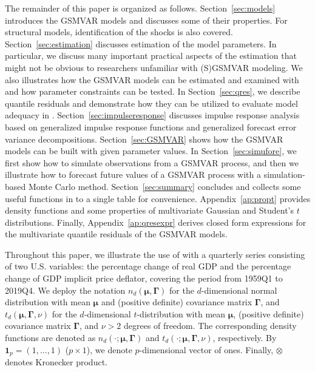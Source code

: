 \documentclass[nojss]{jss} %
\begin{document}
The remainder of this paper is organized as follows. Section~\ref{sec:models} introduces the GSMVAR models and discusses some of their properties. For structural models, identification of the shocks is also covered. Section~\ref{sec:estimation} discusses estimation of the model parameters. In particular, we discuss many important practical aspects of the estimation that might not be obvious to researchers unfamiliar with (S)GSMVAR modeling. We also illustrates how the GSMVAR models can be estimated and examined with  and how parameter constraints can be tested.  In Section~\ref{sec:qres}, we describe quantile residuals and demonstrate how they can be utilized to evaluate model adequacy in . Section~\ref{sec:impulseresponse} discusses impulse response analysis based on generalized impulse response functions and generalized forecast error variance decompositions. Section~\ref{sec:GSMVAR} shows how the GSMVAR models can be built with given parameter values. In Section~\ref{sec:simufore}, we first show how to simulate observations from a GSMVAR process, and then we illustrate how to forecast future values of a GSMVAR process with a simulation-based Monte Carlo method. Section~\ref{sec:summary} concludes and collects some useful functions in  to a single table for convenience. Appendix~\ref{ap:propt} provides density functions and some properties of multivariate Gaussian and Student's $t$ distributions. Finally, Appendix~\ref{ap:qresexpr} derives closed form expressions for the multivariate quantile residuals of the GSMVAR models.

Throughout this paper, we illustrate the use of  with a quarterly series consisting of two U.S. variables: the percentage change of real GDP and the percentage change of GDP implicit price deflator, covering the period from 1959Q1 to 2019Q4. We deploy the notation $n_d(\boldsymbol{\mu},\boldsymbol{\Gamma})$ for the $d$-dimensional normal distribution with mean $\boldsymbol{\mu}$ and (positive definite) covariance matrix $\boldsymbol{\Gamma}$, and $t_d(\boldsymbol{\mu},\boldsymbol{\Gamma},\nu)$ for the $d$-dimensional $t$-distribution with mean $\boldsymbol{\mu}$, (positive definite) covariance matrix $\boldsymbol{\Gamma}$, and $\nu>2$ degrees of freedom. The corresponding density functions are denoted as $n_d(\cdot;\boldsymbol{\mu},\boldsymbol{\Gamma})$ and $t_d(\cdot;\boldsymbol{\mu},\boldsymbol{\Gamma},\nu)$, respectively. By $\boldsymbol{1}_p=(1,...,1)$ ($p \times 1$), we denote $p$-dimensional vector of ones. Finally, $\otimes$ denotes Kronecker product.
\end{document}

